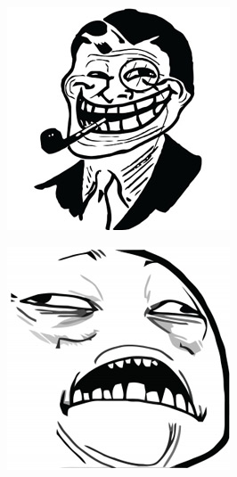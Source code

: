 \begin{multicols}{8}
\begin{center}
\includegraphics[width=\linewidth]{./IMG-GIT/MEMES/Meme-Faces-32.jpg}  
\end{center}

\begin{center}
\includegraphics[width=\linewidth]{./IMG-GIT/MEMES/Meme-Faces-41.jpg}  
\end{center}


\end{multicols}
